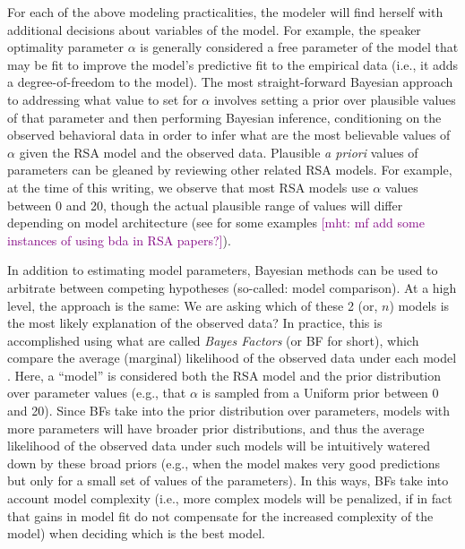 \documentclass{sp}
\newcommand{\gcs}[1]{\textcolor{blue}{[gcs: #1]}}
\newcommand{\mht}[1]{\textcolor{purple}{[mht: #1]}}
\begin{document}
For each of the above modeling practicalities, the modeler will find herself with additional decisions about variables of the model. For example, the speaker optimality parameter $\alpha$ is generally considered a free parameter of the model that may be fit to improve the model's predictive fit to the empirical data (i.e., it adds a degree-of-freedom to the model). The most straight-forward Bayesian approach to addressing what value to set for $\alpha$ involves setting a prior over plausible values of that parameter and then performing Bayesian inference, conditioning on the observed behavioral data in order to infer what are the most believable values of $\alpha$ given the RSA model and the observed data. 
Plausible \emph{a priori} values of parameters can be gleaned by reviewing other related RSA models. For example, at the time of this writing, we observe that most RSA models use $\alpha$ values between 0 and 20, though the actual plausible range of values will differ depending on model architecture (see \citealp{tesslergoodman2019, yoonetal2020} for some examples \mht{mf add some instances of using bda in RSA papers?}). 

In addition to estimating model parameters, Bayesian methods can be used to arbitrate between competing hypotheses (so-called: model comparison). At a high level, the approach is the same: We are asking which of these 2 (or, $n$) models is the most likely explanation of the observed data? In practice, this is accomplished using what are called \emph{Bayes Factors} (or BF for short), which compare the average (marginal) likelihood of the observed data under each model \citep{lee2014bayesian}. Here, a ``model'' is considered both the RSA model and the prior distribution over parameter values (e.g., that $\alpha$ is sampled from a Uniform prior between 0 and 20). Since BFs take into the prior distribution over parameters, models with more parameters will have broader prior distributions, and thus the average likelihood of the observed data under such models will be intuitively watered down by these broad priors (e.g., when the model makes very good predictions but only for a small set of values of the parameters). In this ways, BFs take into account model complexity (i.e., more complex models will be penalized, if in fact that gains in model fit do not compensate for the increased complexity of the model) when deciding which is the best model.



\end{document}

